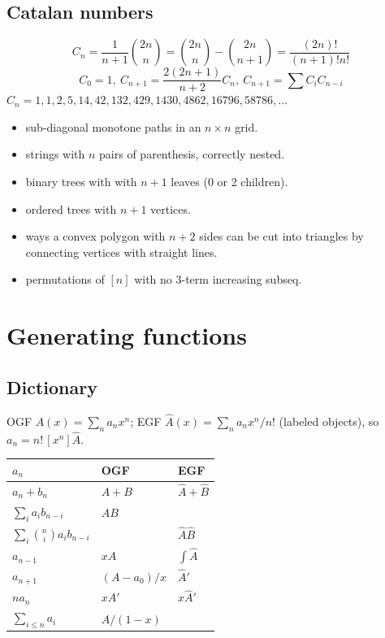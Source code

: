 	\subsection{Catalan numbers}
		\[ C_n=\frac{1}{n+1}\binom{2n}{n}= \binom{2n}{n}-\binom{2n}{n+1} = \frac{(2n)!}{(n+1)!n!} \]
		\[ C_0=1,\ C_{n+1} = \frac{2(2n+1)}{n+2}C_n,\ C_{n+1}=\sum C_iC_{n-i} \]
		${C_n = 1, 1, 2, 5, 14, 42, 132, 429, 1430, 4862, 16796, 58786, \dots}$
		\begin{itemize}[noitemsep]
			\item sub-diagonal monotone paths in an $n\times n$ grid.
			\item strings with $n$ pairs of parenthesis, correctly nested.
			\item binary trees with with $n+1$ leaves (0 or 2 children).
			\item ordered trees with $n+1$ vertices.
			\item ways a convex polygon with $n+2$ sides can be cut into triangles by connecting vertices with straight lines.
			\item permutations of $[n]$ with no 3-term increasing subseq.
		\end{itemize}

\section{Generating functions}
	\subsection{Dictionary}
		OGF $A(x) = \sum_n a_n x^n$; EGF $\hat A(x) = \sum_n a_n x^n / n!$ (labeled objects), so $a_n = n!\,[x^n] \hat A$.
		\begin{center}
		\begin{tabular}{l|l|l}
			$a_n$ & OGF & EGF \\ \hline
			$a_n + b_n$ & $A + B$ & $\hat A + \hat B$ \\
			$\sum_i a_i b_{n-i}$ & $AB$ & \\
			$\sum_i \binom ni a_i b_{n-i}$ & & $\hat A \hat B$ \\
			$a_{n-1}$ & $xA$ & $\int \hat A$ \\
			$a_{n+1}$ & $(A - a_0)/x$ & $\hat A'$ \\
			$n a_n$ & $xA'$ & $x \hat A'$ \\
			$\sum_{i \le n} a_i$ & $A / (1-x)$ & \\
		\end{tabular}
		\end{center}

